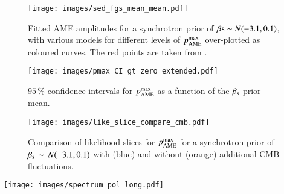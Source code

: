 \documentclass[twocolumn]{aa}
\def\WMAP{\textit{WMAP}}
\newcommand{\BP}{\textsc{BeyondPlanck}}
\newcommand{\lfi}[0]{LFI}
\begin{document}
\begin{figure}[t]
\centering
\texttt{[image: images/sed\_fgs\_mean\_mean.pdf]}
\caption{Fitted AME amplitudes for a synchrotron prior of $\beta{\rm s}\sim N(-3.1,0.1)$, with various models for different levels of $p_{\rm AME}^{\mathrm{max}}$ over-plotted as coloured curves. The red points are taken from \citet{planck2016-l11A}.}
\label{fig:ame_seds}
\end{figure}

\begin{figure}[t]
\texttt{[image: images/pmax\_CI\_gt\_zero\_extended.pdf]}
\caption{$95\,\%$ confidence intervals for $p_{\rm AME}^{\rm max}$ as a function of the $\beta_{\rm s}$ prior mean.
}
\label{fig:pmax_ci}
\end{figure}

\begin{figure}[t]
\texttt{[image: images/like\_slice\_compare\_cmb.pdf]}
\caption{Comparison of likelihood slices for $p_{\rm AME}^{\rm max}$ for a synchrotron prior of $\beta_{\rm s}\,\sim\,N(-3.1,0.1)$ with (blue) and without (orange) additional CMB fluctuations.
}
\label{fig:posteriors}
\end{figure}

\begin{figure*}[t]
\centering
\texttt{[image: images/spectrum\_pol\_long.pdf]}
\caption{Polarization spectrum in the microwave frequency range. In addition to the traditional spectrum which only includes thermal dust and synchrotron emission, an AME (spinning dust) component is added here with a maximum polarization fraction of $1\,\%$. The thermal dust and synchrotron spectra are determined by results from \BP\ \lfi\ analysis \citep{bp14}. The cyan and orange vertical bands correspond to the \WMAP\, and \Planck\ bands respectively.}
\label{fig:nuref}
\end{figure*}
\end{document}
